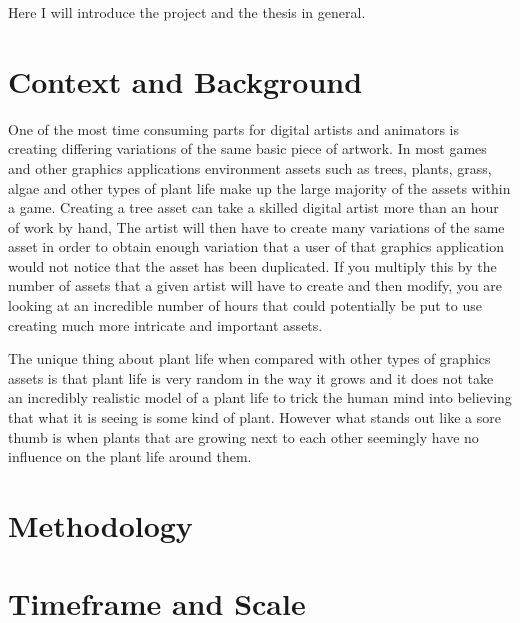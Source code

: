 \begin{flushleft}
Here I will introduce the project and the thesis in general.\\
\end{flushleft}

\section{Context and Background}

\begin{flushleft}
One of the most time consuming parts for digital artists and animators is creating differing variations of the same basic piece of artwork. In most games and other graphics applications environment assets such as trees, plants, grass, algae and other types of plant life make up the large majority of the assets within a game. Creating a tree asset can take a skilled digital artist more than an hour of work by hand, The artist will then have to create many variations of the same asset in order to obtain enough variation that a user of that graphics application would not notice that the asset has been duplicated. If you multiply this by the number of assets that a given artist will have to create and then modify, you are looking at an incredible number of hours that could potentially be put to use creating much more intricate and important assets.\\
\end{flushleft}
\begin{flushleft}
The unique thing about plant life when compared with other types of graphics assets is that plant life is very random in the way it grows and it does not take an incredibly realistic model of a plant life to trick the human mind into believing that what it is seeing is some kind of plant. However what stands out like a sore thumb is when plants that are growing next to each other seemingly have no influence on the plant life around them.\\
\end{flushleft}

\section{Methodology}

\section{Timeframe and Scale}


